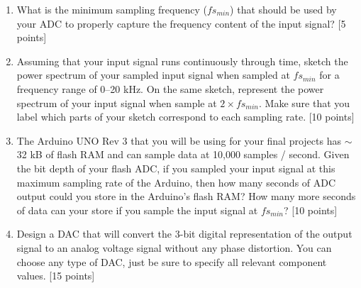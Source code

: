 \begin{enumerate}
\item What is the minimum sampling frequency ($fs_{min}$) that should be
  used by your ADC to properly capture the frequency content of the input
  signal? [5 points]

\clearpage


\item Assuming that your input signal runs continuously through time, sketch
  the power spectrum of your sampled input signal when sampled at $fs_{min}$ for a
  frequency range of 0--20 kHz.  On the same sketch, represent the power
  spectrum of your input signal when sample at $2 \times fs_{min}$. Make sure
  that you label which parts of your sketch correspond to each sampling rate.
  [10 points]

\item The Arduino UNO Rev 3 that you will be using for your final projects has
  $\sim$32 kB of flash RAM and can sample data at 10,000 samples / second.
  Given the bit depth of your flash ADC, if you sampled your input signal at
  this maximum sampling rate of the Arduino, then how many seconds of ADC
  output could you store in the Arduino's flash RAM?  How many more
  seconds of data can your store if you sample the input signal at
  $fs_{min}$?  [10 points]

\item Design a DAC that will convert the 3-bit digital representation of the
  output signal to an analog voltage signal without any phase distortion.  You
  can choose any type of DAC, just be sure to specify all relevant component
  values. [15 points]
\end{enumerate}
